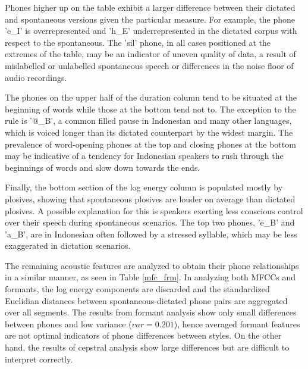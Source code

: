 \documentclass[conference]{IEEEtran}
\begin{document}
Phones higher up on the table exhibit a larger difference between their dictated and spontaneous versions given the particular measure.
For example, the phone 'e\_I' is overrepresented and 'h\_E' underrepresented in the dictated corpus with respect to the spontaneous.
The 'sil' phone, in all cases positioned at the extremes of the table, may be an indicator of uneven quality of data, a result of mislabelled or unlabelled spontaneous speech or differences in the noise floor of audio recordings.

The phones on the upper half of the duration column tend to be situated at the beginning of words while those at the bottom tend not to.
The exception to the rule is '@\_B', a common filled pause in Indonesian and many other languages, which is voiced longer than its dictated counterpart by the widest margin.
The prevalence of word-opening phones at the top and closing phones at the bottom may be indicative of a tendency for Indonesian speakers to rush through the beginnings of words and slow down towards the ends.

Finally, the bottom section of the log energy column is populated mostly by plosives, showing that spontaneous plosives are louder on average than dictated plosives.
A possible explanation for this is speakers exerting less conscious control over their speech during spontaneous scenarios.
The top two phones, 'e\_B' and 'a\_B', are in Indonesian often followed by a stressed syllable, which may be less exaggerated in dictation scenarios.

The remaining acoustic features are analyzed to obtain their phone relationships in a similar manner, as seen in Table \ref{mfc_frm}.
In analyzing both MFCCs and formants, the log energy components are discarded and the standardized Euclidian distances between spontaneous-dictated phone pairs are aggregated over all segments.
The results from formant analysis show only small differences between phones and low variance ($var = 0.201$), hence averaged formant features are not optimal indicators of phone differences between styles.
On the other hand, the results of cepstral analysis show large differences but are difficult to interpret correctly.
\end{document}
